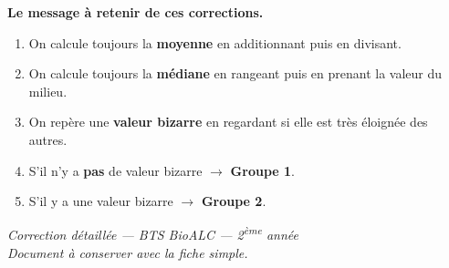 \documentclass[12pt,a4paper]{article}
\begin{document}
\begin{enclair}
\textbf{Le message à retenir de ces corrections.}

\vspace{0.3cm}
\begin{enumerate}[leftmargin=*]
  \item On calcule toujours la \textbf{moyenne} en additionnant puis en divisant.
  \item On calcule toujours la \textbf{médiane} en rangeant puis en prenant la valeur du milieu.
  \item On repère une \textbf{valeur bizarre} en regardant si elle est très éloignée des autres.
  \item S'il n'y a \textbf{pas} de valeur bizarre $\rightarrow$ \textbf{Groupe 1}.
  \item S'il y a une valeur bizarre $\rightarrow$ \textbf{Groupe 2}.
\end{enumerate}
\end{enclair}

\vfill

\begin{center}
\textit{Correction détaillée — BTS BioALC — 2\textsuperscript{ème} année}\\
\textit{Document à conserver avec la fiche simple.}
\end{center}
\end{document}
